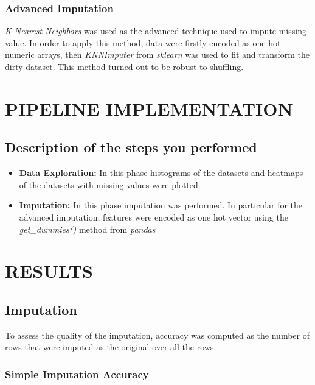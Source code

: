 \documentclass{article}
\begin{document}
\subsubsection{Advanced Imputation}
\emph{K-Nearest Neighbors} was used as the advanced technique used to impute missing value. In order to apply this method, data were firstly encoded as one-hot numeric arrays, then \emph{KNNImputer} from \emph{sklearn} was used to fit and transform the dirty dataset.
This method turned out to be robust to shuffling.
\section{PIPELINE IMPLEMENTATION}
\subsection{Description of the steps you performed}
\begin{itemize}
	\item\textbf{Data Exploration:} In this phase histograms of the datasets and heatmaps of the datasets with missing values were plotted.
	\item\textbf{Imputation:} In this phase imputation was performed.
		In particular for the advanced imputation, features were encoded as one hot vector using the \emph{get\_dummies()} method from \emph{pandas}
\end{itemize}
\newpage
\section{RESULTS}

\subsection{Imputation}
To assess the quality of the imputation, accuracy was computed as the number of rows that were imputed as the original over all the rows.

\subsubsection{Simple Imputation Accuracy}
\end{document}
